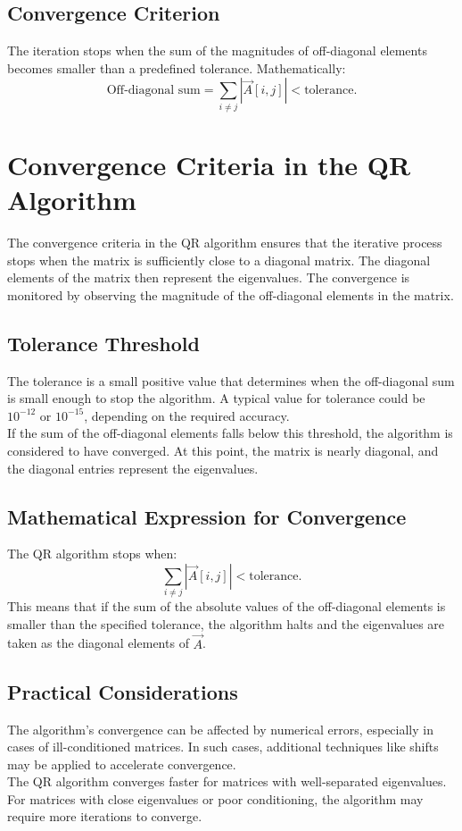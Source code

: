 \documentclass[journal,12pt,onecolumn]{IEEEtran}
\theoremstyle{remark}
\begin{document}
\subsection{Convergence Criterion}
The iteration stops when the sum of the magnitudes of off-diagonal elements becomes smaller than a predefined tolerance. Mathematically:
$$\text{Off-diagonal sum} = \sum_{i \neq j} |\vec{A}[i, j]| < \text{tolerance}.$$
\section{Convergence Criteria in the QR Algorithm}
The convergence criteria in the QR algorithm ensures that the iterative process stops when the matrix is sufficiently close to a diagonal matrix. The diagonal elements of the matrix then represent the eigenvalues. The convergence is monitored by observing the magnitude of the off-diagonal elements in the matrix.
\subsection{Tolerance Threshold}
The tolerance is a small positive value that determines when the off-diagonal sum is small enough to stop the algorithm. A typical value for tolerance could be $ 10^{-12} $ or $ 10^{-15} $, depending on the required accuracy.\\
If the sum of the off-diagonal elements falls below this threshold, the algorithm is considered to have converged. At this point, the matrix is nearly diagonal, and the diagonal entries represent the eigenvalues.
\subsection{Mathematical Expression for Convergence}
The QR algorithm stops when:
	$$\sum_{i \neq j} |\vec{A}[i, j]| < \text{tolerance}.$$
This means that if the sum of the absolute values of the off-diagonal elements is smaller than the specified tolerance, the algorithm halts and the eigenvalues are taken as the diagonal elements of $\vec{A}$.

\subsection{Practical Considerations}
The algorithm's convergence can be affected by numerical errors, especially in cases of ill-conditioned matrices. In such cases, additional techniques like shifts may be applied to accelerate convergence.\\
The QR algorithm converges faster for matrices with well-separated eigenvalues. For matrices with close eigenvalues or poor conditioning, the algorithm may require more iterations to converge.
\end{document}
